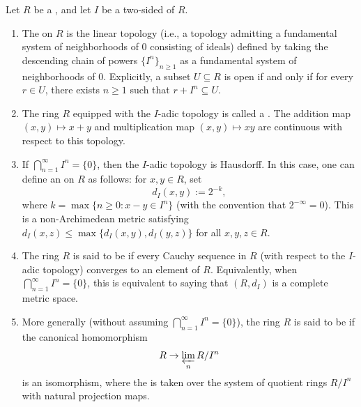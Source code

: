 \begin{definition}\label{definition:i_adic_topology_and_completeness}
    Let $R$ be a , and let $I$ be a two-sided  of $R$.

    \begin{enumerate}
        \item The  on $R$ is the linear topology (i.e., a topology admitting a fundamental system of neighborhoods of $0$ consisting of ideals) defined by taking the descending chain of powers $\{I^n\}_{n \geq 1}$ as a fundamental system of neighborhoods of $0$. Explicitly, a subset $U \subseteq R$ is open if and only if for every $r \in U$, there exists $n \geq 1$ such that $r + I^n \subseteq U$.

        \item The ring $R$ equipped with the $I$-adic topology is called a . The addition map $(x, y) \mapsto x + y$ and multiplication map $(x, y) \mapsto xy$ are continuous with respect to this topology.

        \item If $\bigcap_{n=1}^\infty I^n = \{0\}$, then the $I$-adic topology is Hausdorff. In this case, one can define an  on $R$ as follows: for $x, y \in R$, set
        $$
            d_I(x, y) := 2^{-k},
        $$
        where $k = \max\{n \geq 0 : x - y \in I^n\}$ (with the convention that $2^{-\infty} = 0$). This is a non-Archimedean metric satisfying $d_I(x, z) \leq \max\{d_I(x, y), d_I(y, z)\}$ for all $x, y, z \in R$.

        \item The ring $R$ is said to be  if every Cauchy sequence in $R$ (with respect to the $I$-adic topology) converges to an element of $R$. Equivalently, when $\bigcap_{n=1}^\infty I^n = \{0\}$, this is equivalent to saying that $(R, d_I)$ is a complete metric space.

        \item More generally (without assuming $\bigcap_{n=1}^\infty I^n = \{0\}$), the ring $R$ is said to be  if the canonical homomorphism
        $$
            R \to \varprojlim_{n} R/I^n
        $$
        is an isomorphism, where the  is taken over the system of quotient rings $R/I^n$ with natural projection maps.


\end{enumerate}
\end{definition}
